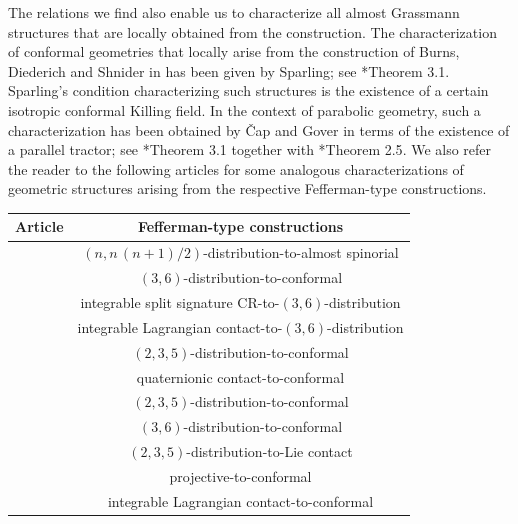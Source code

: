 \documentclass[11pt]{amsart}
\begin{document}
The relations we find also enable us to characterize all almost Grassmann structures that are locally obtained from the construction. The characterization of conformal geometries that locally arise from the construction of Burns, Diederich and Shnider in \cite{BDS} has been given by Sparling; see \cite{Graham}*{Theorem 3.1}. Sparling's condition characterizing such structures is the existence of a certain isotropic conformal Killing field. In the context of parabolic geometry, such a characterization has been obtained by \v Cap and Gover in terms of the existence of a parallel tractor; see \cite{CG08}*{Theorem 3.1} together with \cite{CG06}*{Theorem 2.5}. We also refer the reader to the following articles for some analogous characterizations of geometric structures arising from the respective Fefferman-type constructions.

\begin{table}[h!]
  \begin{center}
    \label{tab:table1}
    \begin{tabular}{l|c}
      \textbf{Article} & \textbf{Fefferman-type constructions} \\
\hline
\cite{Arm} & $(n,n\,(n+1)/2)$-distribution-to-almost spinorial \\
      &$(3,6)$-distribution-to-conformal\\
       &integrable split signature CR-to-$(3,6)$-distribution\\
        &integrable Lagrangian contact-to-$(3,6)$-distribution\\
\hline\cite{HS09} & $(2,3,5)$-distribution-to-conformal \\
\hline\cite{Alt10} & quaternionic contact-to-conformal \\
\hline
\cite{HS11} & $(2,3,5)$-distribution-to-conformal\\
      &$(3,6)$-distribution-to-conformal\\
\hline\cite{LNS17}&$(2,3,5)$-distribution-to-Lie contact\\
\hline\cite{Ham+17}&projective-to-conformal\\
    &integrable Lagrangian contact-to-conformal\\
\end{tabular}
  \end{center}
\end{table}
\end{document}
